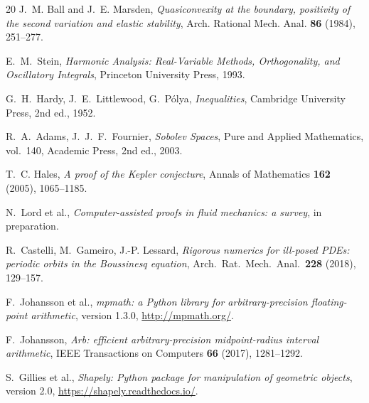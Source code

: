 \documentclass[11pt]{amsart}
\theoremstyle{plain}
\theoremstyle{definition}
\begin{document}
\begin{thebibliography}{20}
J.~M. Ball and J.~E. Marsden, \emph{Quasiconvexity at the boundary,
positivity of the second variation and elastic stability},
Arch. Rational Mech. Anal. \textbf{86} (1984), 251--277.

E.~M.~Stein, \emph{Harmonic Analysis: Real-Variable Methods,
Orthogonality, and Oscillatory Integrals}, Princeton University
Press, 1993.

G.~H.~Hardy, J.~E.~Littlewood, G.~P\'{o}lya, \emph{Inequalities},
Cambridge University Press, 2nd ed., 1952.

R.~A.~Adams, J.~J.~F.~Fournier, \emph{Sobolev Spaces}, Pure and
Applied Mathematics, vol.~140, Academic Press, 2nd ed., 2003.

T.~C. Hales, \emph{A proof of the Kepler conjecture}, Annals of
Mathematics \textbf{162} (2005), 1065--1185.

N.~Lord et al., \emph{Computer-assisted proofs in fluid mechanics:
a survey}, in preparation.

R.~Castelli, M.~Gameiro, J.-P. Lessard, \emph{Rigorous numerics for ill-posed PDEs:
periodic orbits in the Boussinesq equation}, Arch.~Rat.~Mech.~Anal.\
\textbf{228} (2018), 129--157.

F.~Johansson et al., \emph{mpmath: a Python library for arbitrary-precision floating-point arithmetic}, version 1.3.0,
\url{http://mpmath.org/}.

F.~Johansson, \emph{Arb: efficient arbitrary-precision midpoint-radius
interval arithmetic}, IEEE Transactions on Computers \textbf{66}
(2017), 1281--1292.

S.~Gillies et al., \emph{Shapely: Python package for manipulation of
geometric objects}, version 2.0,
\url{https://shapely.readthedocs.io/}.

\end{thebibliography}
\end{document}
